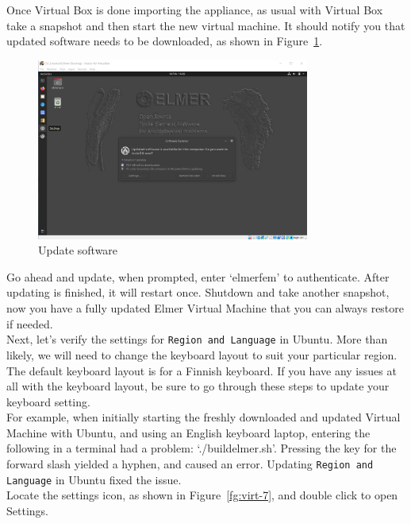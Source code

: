 Once Virtual Box is done importing the appliance, as usual with Virtual Box take a snapshot and then start the new virtual machine.  It should notify you that updated software needs to be downloaded, as shown in Figure~\ref{fg:virt-6}.

\begin{figure}[H]
\begin{center}
\includegraphics[width=0.8\textwidth]{virt-6}
\caption{Update software}\label{fg:virt-6}
\end{center}
\end{figure}

Go ahead and update, when prompted, enter `elmerfem' to authenticate.  After updating is finished, it will restart once.  Shutdown and take another snapshot, now you have a fully updated Elmer Virtual Machine that you can always restore if needed.\\

Next, let's verify the settings for \texttt{Region and Language} in Ubuntu.  More than likely, we will need to change the keyboard layout to suit your particular region.  The default keyboard layout is for a Finnish keyboard.  If you have any issues at all with the keyboard layout, be sure to go through these steps to update your keyboard setting.\\

For example, when initially starting the freshly downloaded and updated Virtual Machine with Ubuntu, and using an English keyboard laptop, entering the following in a terminal had a problem:  `./buildelmer.sh'.  Pressing the key for the forward slash yielded a hyphen, and caused an error.  Updating \texttt{Region and Language} in Ubuntu fixed the issue.\\ 

Locate the settings icon, as shown in Figure~\ref{fg:virt-7}, and double click to open Settings.

